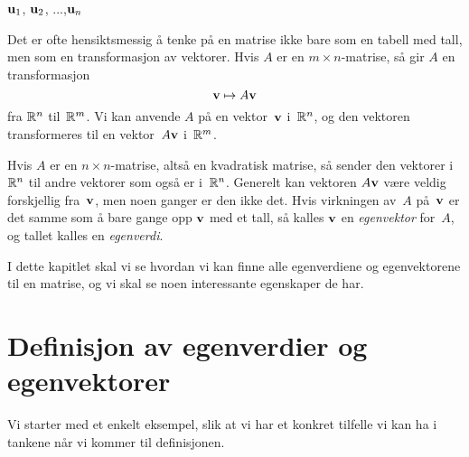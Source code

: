 $\mathbf{u}_1$, $\mathbf{u} _2$, ...,$\mathbf{u}_n$

\label{ch:egenverdier-og-egenvektorer}

Det er ofte hensiktsmessig å tenke på en matrise ikke bare som en
tabell med tall, men som en transformasjon av vektorer.  Hvis $A$ er
en $m \times n$-matrise, så gir $A$ en transformasjon
\[
\mathbf{v} \mapsto A \mathbf{v}
\]
fra $\mathbb{R}^n$ til~$\mathbb{R}^m$.  Vi kan anvende $A$ på en vektor~$\mathbf{v}$
i~$\mathbb{R}^n$, og den vektoren transformeres til en vektor~$A \mathbf{v}$
i~$\mathbb{R}^m$.

Hvis $A$ er en $n \times n$-matrise, altså en kvadratisk matrise, så
sender den vektorer i~$\mathbb{R}^n$ til andre vektorer som også er i~$\mathbb{R}^n$.
Generelt kan vektoren $A \mathbf{v}$ være veldig forskjellig fra~$\mathbf{v}$,
men noen ganger er den ikke det.  Hvis virkningen av~$A$ på~$\mathbf{v}$ er
det samme som å bare gange opp $\mathbf{v}$ med et tall, så kalles $\mathbf{v}$
en \emph{egenvektor} for~$A$, og tallet kalles en \emph{egenverdi}.

I dette kapitlet skal vi se hvordan vi kan finne alle egenverdiene og
egenvektorene til en matrise, og vi skal se noen interessante
egenskaper de har.


\section*{Definisjon av egenverdier og egenvektorer}

Vi starter med et enkelt eksempel, slik at vi har et konkret tilfelle
vi kan ha i tankene når vi kommer til definisjonen.

